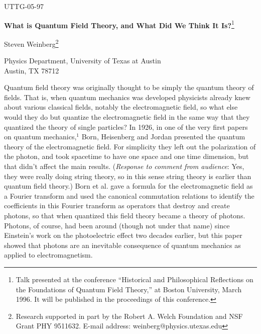 \def\fnote#1#2{\begingroup\def\thefootnote{#1}\footnote{#2}
\endgroup}



\hfill UTTG-05-97

\begin{center}
{\bf What is Quantum Field Theory, and What Did We Think It
Is?}\fnote{*}{Talk presented at the conference ``Historical
and Philosophical Reflections on the Foundations of Quantum
Field Theory,'' at Boston University, March 1996.  It will
be
published in the proceedings of this conference.}

\vspace{12pt}
\noindent
Steven Weinberg\fnote{**}{Research supported in part by the
Robert A. Welch
 Foundation and NSF Grant PHY 9511632.  E-mail address:
weinberg@physics.utexas.edu}\\{}

\vspace{12pt}
\noindent
Physics Department, University of Texas at Austin\\
Austin, TX 78712
\end{center}

\vspace{18pt}

Quantum field theory was originally thought to be simply the
quantum theory of fields.  That is, when quantum mechanics
was developed physicists already knew about various
classical fields, notably the electromagnetic field, so what
else would they do but quantize the electromagnetic field in
the same way that they quantized the theory of single
particles?  In 1926, in one of the very first papers on
quantum mechanics,$^1$ Born, Heisenberg and Jordan presented
the
quantum theory of the electromagnetic field.  For simplicity
they left out the polarization of the photon, and took
spacetime to have one space and one time dimension, but that
didn't affect the main results.  ({\it Response to comment
from audience}:
Yes, they were really doing string theory, so in this sense
string theory is earlier than quantum field theory.)  Born
et
al. gave a formula for the electromagnetic field as a
Fourier transform and used the canonical commutation
relations to identify the coefficients in this Fourier
transform as operators that destroy and create photons, so
that when quantized this field theory became a theory of
photons.  Photons, of course, had been around (though not
under that name) since Einstein's work on the photoelectric
effect two decades earlier, but this paper showed that
photons are an inevitable consequence of quantum mechanics
as applied to electromagnetism.

